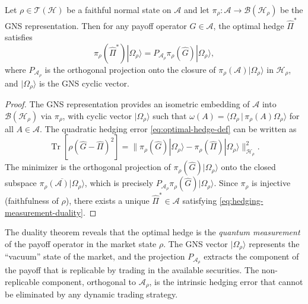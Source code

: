 \begin{theorem}\label{thm:hedging-measurement}
Let $\rho \in \mathcal{T}(\mathcal{H})$ be a faithful normal state on $\mathcal{A}$
and let $\pi_\rho : \mathcal{A} \to \mathcal{B}(\mathcal{H}_\rho)$ be the GNS
representation. Then for any payoff operator $\hat{G} \in \mathcal{A}$, the optimal
hedge $\hat{\Pi}^*$ satisfies
\begin{equation}\label{eq:hedging-measurement-duality}
    \pi_\rho(\hat{\Pi}^*) |\Omega_\rho\rangle = P_{\mathcal{A}_\rho}
    \pi_\rho(\hat{G}) |\Omega_\rho\rangle,
\end{equation}
where $P_{\mathcal{A}_\rho}$ is the orthogonal projection onto the closure of
$\pi_\rho(\mathcal{A}) |\Omega_\rho\rangle$ in $\mathcal{H}_\rho$, and
$|\Omega_\rho\rangle$ is the GNS cyclic vector.
\end{theorem}

\begin{proof}
The GNS representation provides an isometric embedding of $\mathcal{A}$ into
$\mathcal{B}(\mathcal{H}_\rho)$ via $\pi_\rho$, with cyclic vector
$|\Omega_\rho\rangle$ such that
$\omega(A) = \langle \Omega_\rho \,|\, \pi_\rho(A) \Omega_\rho \rangle$ for all
$A \in \mathcal{A}$. The quadratic hedging error \eqref{eq:optimal-hedge-def} can
be written as
\begin{equation*}
    \operatorname{Tr}[\rho (\hat{G} - \hat{\Pi})^2]
    = \|\pi_\rho(\hat{G}) |\Omega_\rho\rangle
    - \pi_\rho(\hat{\Pi}) |\Omega_\rho\rangle\|_{\mathcal{H}_\rho}^2.
\end{equation*}
The minimizer is the orthogonal projection of $\pi_\rho(\hat{G}) |\Omega_\rho\rangle$
onto the closed subspace $\overline{\pi_\rho(\mathcal{A}) |\Omega_\rho\rangle}$,
which is precisely $P_{\mathcal{A}_\rho} \pi_\rho(\hat{G}) |\Omega_\rho\rangle$.
Since $\pi_\rho$ is injective (faithfulness of $\rho$), there exists a unique
$\hat{\Pi}^* \in \mathcal{A}$ satisfying \eqref{eq:hedging-measurement-duality}.
\end{proof}

\begin{remark}\label{rem:econ-interp}
The duality theorem reveals that the optimal hedge is the \emph{quantum measurement}
of the payoff operator in the market state $\rho$. The GNS vector
$|\Omega_\rho\rangle$ represents the ``vacuum'' state of the market, and the
projection $P_{\mathcal{A}_\rho}$ extracts the component of the payoff that is
replicable by trading in the available securities. The non-replicable component,
orthogonal to $\mathcal{A}_\rho$, is the intrinsic hedging error that cannot be
eliminated by any dynamic trading strategy.
\end{remark}

